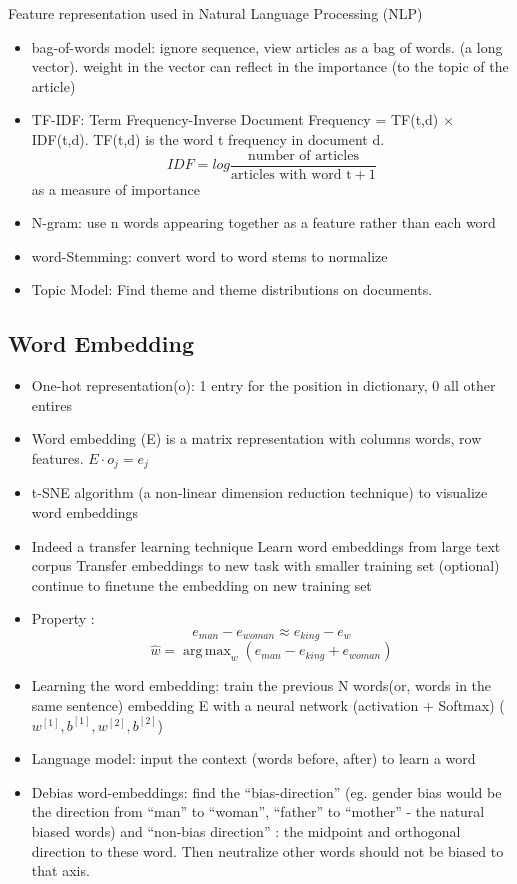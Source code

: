 \documentclass[11pt, openany]{book}              %
\DeclareMathOperator*{\argmax}{arg\,max}  %
\begin{document}
Feature representation used in Natural Language Processing (NLP)
\begin{itemize}
	\item bag-of-words model: ignore sequence, view articles as a bag of words. (a long vector). weight in the vector can reflect in the importance (to the topic of the article)
	\item TF-IDF: Term Frequency-Inverse Document Frequency = TF(t,d) $\times$ IDF(t,d). TF(t,d) is the word t frequency in document d. 
		$$IDF = log \frac{\text{number of articles}}{\text{articles with word t} + 1}$$
		as a measure of importance
	\item N-gram: use n words appearing together as a feature rather than each word
	\item word-Stemming: convert word to word stems to normalize
	\item Topic Model: Find theme and theme distributions on documents.
\end{itemize}
\subsection{Word Embedding}

\begin{itemize}
    \item One-hot representation(o): 1 entry for the position in dictionary, 0 all other entires
    \item Word embedding (E) is a matrix representation with columns words, row features.  $E \cdot o_j = e_j$
    \item t-SNE algorithm (a non-linear dimension reduction technique) to visualize word embeddings
    \item Indeed a transfer learning technique
    	\subitem Learn word embeddings from large text corpus
    	\subitem Transfer embeddings to new task with smaller training set 
    	\subitem (optional) continue to finetune the embedding on new training set
	\item Property : 
		$$e_{man} - e_{woman}  \approx e_{king} - e_{w}$$
		$$\hat{w} = \argmax_{w} (e_{man}  - e_{king} +e_{woman}) $$
	\item Learning the word embedding: train the previous N words(or, words in the same sentence) embedding E with a neural network (activation + Softmax) ( $w^{[1]}, b^{[1]}, w^{[2]}, b^{[2]}$) 
	\item Language model: input the context (words before, after) to learn a word 
	\item Debias word-embeddings: find the “bias-direction” (eg. gender bias would be the direction from “man” to “woman”, “father” to “mother” - the natural biased words) and “non-bias direction” : the midpoint and orthogonal direction to these word. Then neutralize other words should not be biased to that axis. 
\end{itemize}
\end{document}
